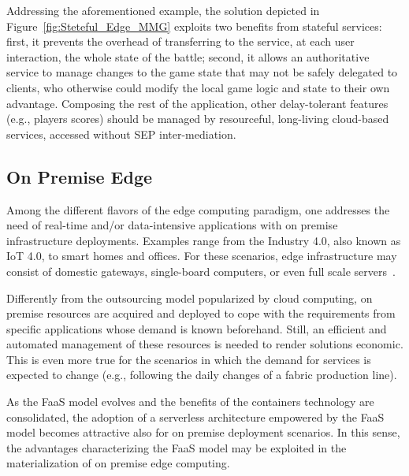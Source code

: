 Addressing the aforementioned example, the solution depicted in Figure~\ref{fig:Steteful_Edge_MMG} exploits two benefits from stateful services: first, it prevents the overhead of transferring to the service, at each user interaction, the whole state of the battle; second, it allows an authoritative service to manage changes to the game state that may not be safely delegated to clients, who otherwise could modify the local game logic and state to their own advantage.
Composing the rest of the application, other delay-tolerant features (e.g., players scores) should be managed by resourceful, long-living cloud-based services, accessed without SEP inter-mediation.  %

\subsection{On Premise Edge}

Among the 
different flavors of the edge computing paradigm, one addresses the need of real-time and/or data-intensive applications with on premise infrastructure deployments. Examples range from the Industry 4.0, also known as IoT 4.0, to
smart homes and offices. For these scenarios, edge infrastructure may consist of domestic gateways, single-board computers, or even full scale servers~\cite{}.

Differently from the outsourcing model popularized by cloud computing, on premise resources are acquired and deployed to cope with the requirements from specific applications whose demand is known beforehand. Still, an efficient and automated management of these resources is needed to render solutions economic. This is even more true for the scenarios in which the demand for services is expected to change (e.g., following the daily changes of a fabric production line). 


As the FaaS model evolves and the benefits of the containers technology are consolidated, the adoption of a serverless architecture empowered by the FaaS model becomes attractive also for on premise deployment scenarios. In this sense, the advantages characterizing the FaaS model may be exploited in the materialization of on premise edge computing.

